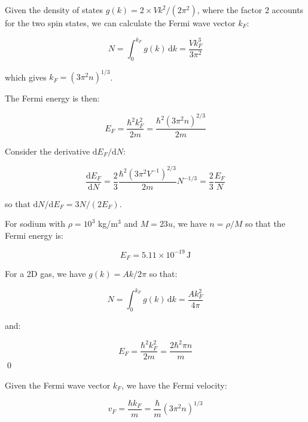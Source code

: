 \documentclass[12pt]{article}
\begin{document}
Given the density of states $g(k) = 2 \times Vk^{2}/(2\pi^{2})$, where the factor $2$ accounts for the two spin states, we can calculate the Fermi wave vector $k_{F}$:

\begin{equation}
    N = \int_{0}^{k_{F}} g(k) \, \mathrm{d}k = \frac{Vk_{F}^{3}}{3\pi^{2}}
\end{equation}

which gives $k_{F} = (3\pi^{2}n)^{1/3}$.

The Fermi energy is then:

\begin{equation}
    E_{F} = \frac{\hbar^{2}k_{F}^{2}}{2m} = \frac{\hbar^{2}(3\pi^{2}n)^{2/3}}{2m}
\end{equation}

Consider the derivative $\mathrm{d}E_{F}/\mathrm{d}N$:

\begin{equation}
    \frac{\mathrm{d}E_{F}}{\mathrm{d}N} = \frac{2}{3} \frac{\hbar^{2}(3\pi^{2}V^{-1})^{2/3}}{2m} N^{-1/3} = \frac{2}{3} \frac{E_{F}}{N}
\end{equation}

so that $\mathrm{d}N/\mathrm{d}E_{F} = 3N/(2E_{F})$.

For sodium with $\rho = 10^{3}$ kg/m$^{3}$ and $M = 23u$, we have $n = \rho/M$ so that the Fermi energy is:

\begin{equation}
    E_{F} = 5.11 \times 10^{-19} \, \mathrm{J}
\end{equation}

For a 2D gas, we have $g(k) = Ak/2\pi$ so that:

\begin{equation}
    N = \int_{0}^{k_{F}} g(k) \, \mathrm{d}k = \frac{Ak_{F}^{2}}{4\pi}
\end{equation}

and:

\begin{equation}
    E_{F} = \frac{\hbar^{2}k_{F}^{2}}{2m} = \frac{2\hbar^{2}\pi n}{m}
\end{equation}
\qed




Given the Fermi wave vector $k_{F}$, we have the Fermi velocity:

\begin{equation}
    v_{F} = \frac{\hbar k_{F}}{m} = \frac{\hbar}{m} (3\pi^{2}n)^{1/3}
\end{equation}
\end{document}
